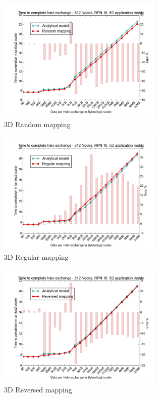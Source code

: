 \documentclass{beamer}
\begin{document}
\begin{frame}
\begin{figure}
\caption{3D Random mapping}
  \includegraphics[width=0.7\textwidth]{../mappings/3d_random.png}
\end{figure}
\end{frame}

\begin{frame}
\begin{figure}
\caption{3D Regular mapping}
  \includegraphics[width=0.7\textwidth]{../mappings/3d_regular.png}
\end{figure}
\end{frame}

\begin{frame}
\begin{figure}
\caption{3D Reversed mapping}
  \includegraphics[width=0.7\textwidth]{../mappings/3d_reversed.png}
\end{figure}
\end{frame}
\end{document}

